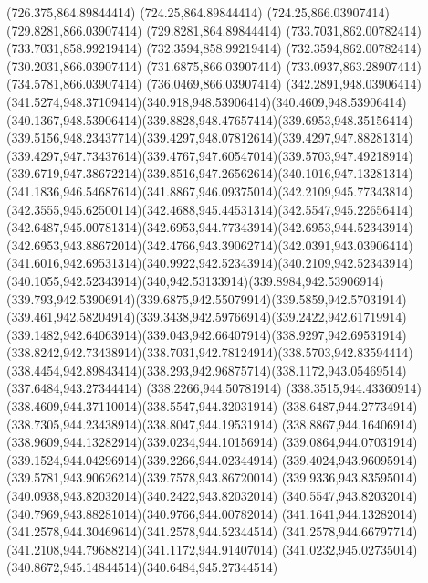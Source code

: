 {{	\lineto(726.375,864.89844414)
	\lineto(724.25,864.89844414)
	\lineto(724.25,866.03907414)
	\lineto(729.8281,866.03907414)
	\lineto(729.8281,864.89844414)
	\closepath
	\moveto(733.7031,862.00782414)
	\lineto(733.7031,858.99219414)
	\lineto(732.3594,858.99219414)
	\lineto(732.3594,862.00782414)
	\lineto(730.2031,866.03907414)
	\lineto(731.6875,866.03907414)
	\lineto(733.0937,863.28907414)
	\lineto(734.5781,866.03907414)
	\lineto(736.0469,866.03907414)
	\closepath
	\moveto(342.2891,948.03906414)
	\curveto(341.5274,948.37109414)(340.918,948.53906414)(340.4609,948.53906414)
	\curveto(340.1367,948.53906414)(339.8828,948.47657414)(339.6953,948.35156414)
	\curveto(339.5156,948.23437714)(339.4297,948.07812614)(339.4297,947.88281314)
	\curveto(339.4297,947.73437614)(339.4767,947.60547014)(339.5703,947.49218914)
	\curveto(339.6719,947.38672214)(339.8516,947.26562614)(340.1016,947.13281314)
	\curveto(341.1836,946.54687614)(341.8867,946.09375014)(342.2109,945.77343814)
	\curveto(342.3555,945.62500114)(342.4688,945.44531314)(342.5547,945.22656414)
	\curveto(342.6487,945.00781314)(342.6953,944.77343914)(342.6953,944.52343914)
	\curveto(342.6953,943.88672014)(342.4766,943.39062714)(342.0391,943.03906414)
	\curveto(341.6016,942.69531314)(340.9922,942.52343914)(340.2109,942.52343914)
	\curveto(340.1055,942.52343914)(340,942.53133914)(339.8984,942.53906914)
	\curveto(339.793,942.53906914)(339.6875,942.55079914)(339.5859,942.57031914)
	\curveto(339.461,942.58204914)(339.3438,942.59766914)(339.2422,942.61719914)
	\curveto(339.1482,942.64063914)(339.043,942.66407914)(338.9297,942.69531914)
	\curveto(338.8242,942.73438914)(338.7031,942.78124914)(338.5703,942.83594414)
	\curveto(338.4454,942.89843414)(338.293,942.96875714)(338.1172,943.05469514)
	\lineto(337.6484,943.27344414)
	\lineto(338.2266,944.50781914)
	\curveto(338.3515,944.43360914)(338.4609,944.37110014)(338.5547,944.32031914)
	\curveto(338.6487,944.27734914)(338.7305,944.23438914)(338.8047,944.19531914)
	\curveto(338.8867,944.16406914)(338.9609,944.13282914)(339.0234,944.10156914)
	\curveto(339.0864,944.07031914)(339.1524,944.04296914)(339.2266,944.02344914)
	\curveto(339.4024,943.96095914)(339.5781,943.90626214)(339.7578,943.86720014)
	\curveto(339.9336,943.83595014)(340.0938,943.82032014)(340.2422,943.82032014)
	\curveto(340.5547,943.82032014)(340.7969,943.88281014)(340.9766,944.00782014)
	\curveto(341.1641,944.13282014)(341.2578,944.30469614)(341.2578,944.52344514)
	\curveto(341.2578,944.66797714)(341.2108,944.79688214)(341.1172,944.91407014)
	\curveto(341.0232,945.02735014)(340.8672,945.14844514)(340.6484,945.27344514)
}}
